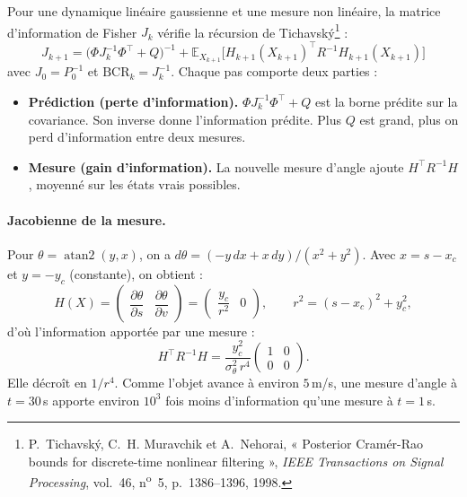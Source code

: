 \documentclass[11pt,a4paper]{article}
\newcommand{\E}{\mathbb{E}}
\newcommand{\BCR}{\mathrm{BCR}}
\DeclareMathOperator{\atantwo}{atan2}
\theoremstyle{remark}
\begin{document}
Pour une dynamique linéaire gaussienne et une mesure non linéaire, la matrice d'information de Fisher $J_k$ vérifie la récursion de Tichavský\footnote{P.~Tichavský, C.~H. Muravchik et A.~Nehorai, « Posterior Cramér-Rao bounds for discrete-time nonlinear filtering », \emph{IEEE Transactions on Signal Processing}, vol.~46, n\textsuperscript{o}~5, p.~1386--1396, 1998.} :
\begin{equation}
\boxed{\;
J_{k+1} = \big(\Phi J_k^{-1} \Phi^\top + Q\big)^{-1} + \E_{X_{k+1}}\!\Big[H_{k+1}(X_{k+1})^\top R^{-1} H_{k+1}(X_{k+1})\Big]
\;}
\label{eq:pcrb}
\end{equation}
avec $J_0 = P_0^{-1}$ et $\BCR_k = J_k^{-1}$.
Chaque pas comporte deux parties :
\begin{itemize}[nosep]
  \item \textbf{Prédiction (perte d'information).} $\Phi J_k^{-1} \Phi^\top + Q$ est la borne prédite sur la covariance. Son inverse donne l'information prédite. Plus $Q$ est grand, plus on perd d'information entre deux mesures.
  \item \textbf{Mesure (gain d'information).} La nouvelle mesure d'angle ajoute $H^\top R^{-1} H$, moyenné sur les états vrais possibles.
\end{itemize}

\paragraph{Jacobienne de la mesure.}
Pour $\theta = \atantwo(y, x)$, on a $d\theta = (-y\,dx + x\,dy)/(x^2 + y^2)$. Avec $x = s - x_c$ et $y = -y_c$ (constante), on obtient :
\begin{equation}
H(X) = \begin{pmatrix} \dfrac{\partial\theta}{\partial s} & \dfrac{\partial\theta}{\partial v} \end{pmatrix}
= \begin{pmatrix} \dfrac{y_c}{r^2} & 0 \end{pmatrix},
\qquad r^2 = (s - x_c)^2 + y_c^2,
\end{equation}
d'où l'information apportée par une mesure :
\begin{equation}
H^\top R^{-1} H = \frac{y_c^2}{\sigma_\theta^2\, r^4} \begin{pmatrix} 1 & 0 \\ 0 & 0 \end{pmatrix}.
\label{eq:info}
\end{equation}
Elle décroît en $1/r^4$. Comme l'objet avance à environ $5$\,m/s, une mesure d'angle à $t = 30$\,s apporte environ $10^3$ fois moins d'information qu'une mesure à $t = 1$\,s.
\end{document}
